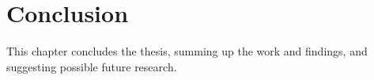 \chapter{Conclusion}
\label{chap:conclusion}
This chapter concludes the thesis, summing up the work and findings, and suggesting possible future research.

